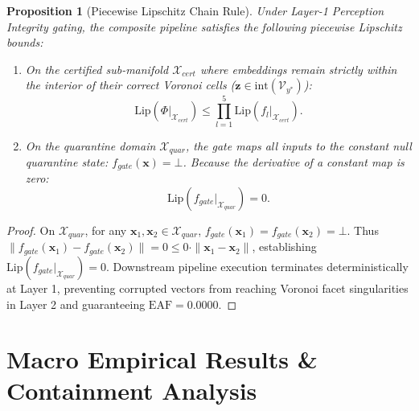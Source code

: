 \documentclass[conference]{IEEEtran}
\newtheorem{proposition}{Proposition}
\begin{document}
\begin{proposition}[Piecewise Lipschitz Chain Rule]
Under Layer-1 Perception Integrity gating, the composite pipeline satisfies the following piecewise Lipschitz bounds:
\begin{enumerate}
    \item On the certified sub-manifold $\mathcal{X}_{cert}$ where embeddings remain strictly within the interior of their correct Voronoi cells ($\mathbf{z} \in \mathrm{int}(\mathcal{V}_{y^*})$):
    \begin{equation}
    \mathrm{Lip}(\Phi|_{\mathcal{X}_{cert}}) \le \prod_{l=1}^5 \mathrm{Lip}(f_l|_{\mathcal{X}_{cert}}).
    \end{equation}
    \item On the quarantine domain $\mathcal{X}_{quar}$, the gate maps all inputs to the constant null quarantine state: $f_{gate}(\mathbf{x}) = \bot$. Because the derivative of a constant map is zero:
    \begin{equation}
    \mathrm{Lip}(f_{gate}|_{\mathcal{X}_{quar}}) = 0.
    \end{equation}
\end{enumerate}
\end{proposition}

\begin{proof}
On $\mathcal{X}_{quar}$, for any $\mathbf{x}_1, \mathbf{x}_2 \in \mathcal{X}_{quar}$, $f_{gate}(\mathbf{x}_1) = f_{gate}(\mathbf{x}_2) = \bot$. Thus $\|f_{gate}(\mathbf{x}_1) - f_{gate}(\mathbf{x}_2)\| = 0 \le 0 \cdot \|\mathbf{x}_1 - \mathbf{x}_2\|$, establishing $\mathrm{Lip}(f_{gate}|_{\mathcal{X}_{quar}}) = 0$. Downstream pipeline execution terminates deterministically at Layer 1, preventing corrupted vectors from reaching Voronoi facet singularities in Layer 2 and guaranteeing $\mathrm{EAF} = 0.0000$.
\end{proof}

\section{Macro Empirical Results \& Containment Analysis}
\end{document}
